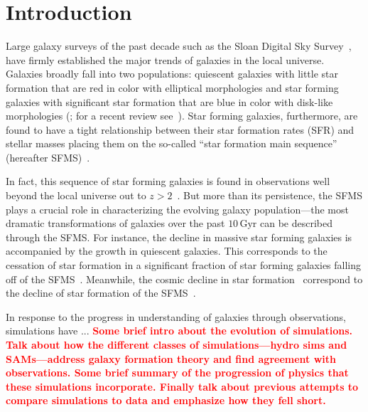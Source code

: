 \documentclass[preprint2,tighten]{aastex62}
\newcommand{\todo}[1]{{\bf \textcolor{red}{ #1}}}
\begin{document}
\section{Introduction}
Large galaxy surveys of the past decade such as the Sloan Digital Sky 
Survey~\citep[SDSS;][]{york2000}, have firmly established the major 
trends of galaxies in the local universe. Galaxies %
broadly fall into two populations: quiescent galaxies with little star
formation that are red in color with elliptical morphologies and star 
forming galaxies with significant star formation that are blue in color 
with disk-like morphologies 
(\citealt{kauffmann2003, blanton2003, baldry2006, taylor2009, moustakas2013}; 
for a recent review see~\citealt{blanton2009}). 
Star forming galaxies, furthermore, are found to have a tight relationship 
between their star formation rates (SFR) and stellar masses placing them
on the so-called ``star formation main sequence'' (hereafter 
SFMS)~\citep[\emph{e.g.}][]{noeske2007, daddi2007, salim2007}.


In fact, this sequence of star forming galaxies is found in observations 
well beyond the local universe out to $z > 2$~\citep{wang2013, schreiber2015}.
But more than 
its persistence, the SFMS plays a crucial role in characterizing 
the evolving galaxy population---the most dramatic transformations of 
galaxies over the past $10\,\mathrm{Gyr}$ can be described through the SFMS. 
For instance, the decline in massive star forming galaxies is accompanied by  
the growth in quiescent galaxies. This corresponds to the cessation of 
star formation in a significant fraction of star forming galaxies falling off of
the SFMS~\citep{blanton2006, borch2006,bundy2006, moustakas2013}. Meanwhile, 
the cosmic decline in star 
formation~\citep{hopkins2006, behroozi2013a, madau2014}
correspond to the decline of star formation of the SFMS~\citep{schreiber2015}. 

In response to the progress in understanding of galaxies through observations,
simulations have ...
\todo{Some brief intro about the evolution of simulations. Talk about how the
different classes of simulations---hydro sims and SAMs---address galaxy 
formation theory and find agreement with observations. Some brief summary 
of the progression of physics that these simulations incorporate. 
Finally talk about previous attempts to compare simulations to data and 
emphasize how they fell short.}
\end{document}
